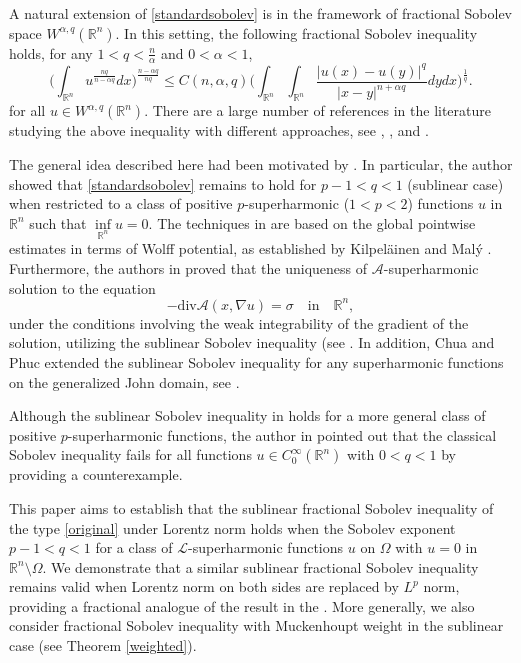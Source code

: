\documentclass[12pt]{amsart}
\newcommand{\R}{\mathbb{R}}
\newcommand{\be}{\begin{equation}}
\newcommand{\ee}{\end{equation}}
\numberwithin{equation}{section}
\theoremstyle{plain}
\theoremstyle{definition}
\theoremstyle{remark}
\begin{document}
A natural extension of \eqref{standardsobolev} is in the framework of fractional Sobolev space $W^{\alpha,q}(\R^{n})$. In this setting, the following fractional Sobolev inequality holds, for any $1<q<\frac{n}{\alpha}$ and $0<\alpha<1$,
\be\label{original}
\big( \int_{\R^{n}} u^{\frac{nq}{n-\alpha q}} dx\big)^{\frac{n-\alpha q}{nq}}\leq C(n,\alpha,q)\Big( \int_{\R^{n}}\int_{\R^{n}}\frac{|u(x)-u(y)|^{q}}{|x-y|^{n+\alpha q}} dydx\Big)^{\frac{1}{q}}.
\ee
for all $u\in W^{\alpha,q}(\R^{n})$.  There are a large number of references in the literature studying the above inequality with different approaches, see \cite{EGE}, \cite{Po}, and \cite{Sa}.

 The general idea described here had been motivated by \cite{Ph1}. In particular, the author showed that \eqref{standardsobolev} remains to hold for $p-1<q<1$ (sublinear case) when restricted to a class of positive $p$-superharmonic ($1<p<2$) functions $u$ in $\R^{n}$ such that $\inf\limits_{\R^{n}} u=0.$ The techniques in \cite{Ph1} are based on the global pointwise estimates in terms of Wolff potential, as established by Kilpel\"{a}inen and Mal\'{y} \cite{KM1}. Furthermore, the authors in \cite{PV23} proved that the uniqueness of $\mathcal{A}$-superharmonic solution  to the equation 
 \[
 -\text{div} \mathcal{A}(x,\nabla u)=\sigma\quad\text{in}\quad \R^{n},
 \]
under the conditions involving the weak integrability of the gradient of the solution, utilizing the sublinear Sobolev inequality (see \cite[Theorem 3.12]{PV23}.  In addition, Chua and Phuc extended the sublinear Sobolev inequality for any superharmonic functions on the generalized John domain, see \cite[Corollary 5.7]{CP}.

 Although the sublinear Sobolev inequality in \cite{Ph1} holds for a more general class of positive $p$-superharmonic functions, the author in \cite{Da} pointed out that the classical Sobolev inequality fails for all functions $u\in C_{0}^{\infty}(\mathbb{R}^{n})$ with $0<q<1$ by providing a counterexample.

This paper aims to establish that the sublinear fractional Sobolev inequality of the type \eqref{original} under Lorentz norm holds when the Sobolev exponent $p-1<q<1$ for a class of $\mathcal{L}$-superharmonic functions $u$ on $\Omega$ with $u=0$ in $\R^{n}\setminus\Omega$. We demonstrate that a similar sublinear fractional Sobolev inequality remains valid when  Lorentz norm on both sides are replaced by $L^{p}$ norm, providing a fractional analogue of the result in the \cite{Ph1}.  More generally, we also consider fractional Sobolev inequality with Muckenhoupt weight in the sublinear case (see Theorem \ref{weighted}).
\end{document}
